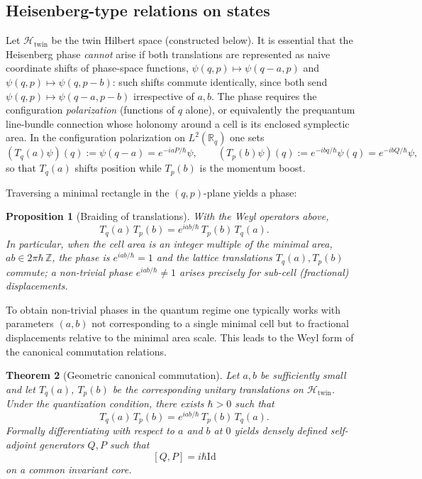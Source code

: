 \documentclass[11pt]{article}
\numberwithin{equation}{section}
\newtheorem{theorem}{Theorem}[section]
\newtheorem{proposition}[theorem]{Proposition}
\theoremstyle{definition}
\theoremstyle{remark}
\newcommand{\Z}{\mathbb{Z}}
\newcommand{\R}{\mathbb{R}}
\newcommand{\Id}{\mathrm{Id}}
\newcommand{\Htw}{\mathcal{H}_{\mathrm{twin}}}
\begin{document}
	\subsection{Heisenberg-type relations on states}
	
		Let $\Htw$ be the twin Hilbert space (constructed below). It is
		essential that the Heisenberg phase \emph{cannot} arise if both
		translations are represented as naive coordinate shifts of
		phase-space functions, $\psi(q,p)\mapsto\psi(q-a,p)$ and
		$\psi(q,p)\mapsto\psi(q,p-b)$: such shifts commute identically, since
		both send $\psi(q,p)\mapsto\psi(q-a,p-b)$ irrespective of $a,b$. The
		phase requires the configuration \emph{polarization} (functions of
		$q$ alone), or equivalently the prequantum line-bundle connection
		whose holonomy around a cell is its enclosed symplectic area. In the
		configuration polarization on $L^2(\R_q)$ one sets
		\[
		(T_q(a)\psi)(q) := \psi(q-a) = e^{-iaP/\hbar}\psi,\qquad
		(T_p(b)\psi)(q) := e^{-ibq/\hbar}\psi(q) = e^{-ibQ/\hbar}\psi,
		\]
		so that $T_q(a)$ shifts position while $T_p(b)$ is the momentum
		boost.
	
	Traversing a minimal rectangle in the $(q,p)$-plane yields a phase:
	
		\begin{proposition}[Braiding of translations]\label{prop:braid}
			With the Weyl operators above,
			\begin{equation}\label{eq:braid}
				T_q(a)\, T_p(b) = e^{i ab/\hbar}\, T_p(b)\, T_q(a).
			\end{equation}
			In particular, when the cell area is an integer multiple of the
			minimal area, $ab\in 2\pi\hbar\,\Z$, the phase is
			$e^{iab/\hbar}=1$ and the lattice translations $T_q(a),T_p(b)$
			commute; a non-trivial phase $e^{iab/\hbar}\neq 1$ arises precisely
			for sub-cell (fractional) displacements.
		\end{proposition}
	
	To obtain non-trivial phases in the quantum regime one typically works
	with parameters $(a,b)$ not corresponding to a single minimal cell but
	to fractional displacements relative to the minimal area scale. This
	leads to the Weyl form of the canonical commutation relations.
	
	\begin{theorem}[Geometric canonical commutation]\label{thm:CCR}
		Let $a,b$ be sufficiently small and let $T_q(a)$, $T_p(b)$ be the
		corresponding unitary translations on $\Htw$. Under the quantization
		condition, there exists $\hbar>0$ such that
		\begin{equation}\label{eq:Weyl}
			T_q(a)\, T_p(b) = e^{i ab/\hbar}\, T_p(b)\, T_q(a).
		\end{equation}
		Formally differentiating with respect to $a$ and $b$ at $0$ yields
		densely defined self-adjoint generators $Q,P$ such that
		\[
		[Q,P] = i\hbar \Id
		\]
		on a common invariant core.
	\end{theorem}
	
\end{document}
